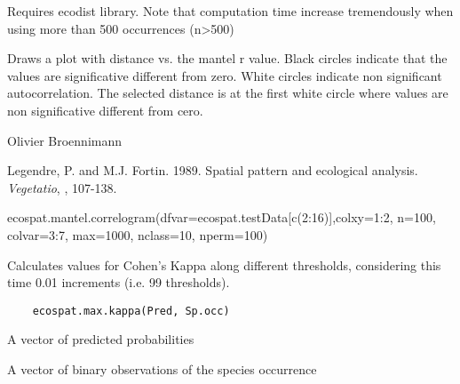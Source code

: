 \documentclass[a4paper]{book}
\begin{document}
%
\begin{Details}\relax
Requires ecodist library. Note that computation time increase tremendously when using more than 500 occurrences (n>500)
\end{Details}
%
\begin{Value}
Draws a plot with distance vs. the mantel r  value. Black circles indicate that the values are significative different from zero. White circles indicate non significant autocorrelation. The selected distance is at the first white circle where values are non significative different from cero. 
\end{Value}
%
\begin{Author}\relax
Olivier Broennimann 
\end{Author}
%
\begin{References}\relax
Legendre, P. and M.J. Fortin. 1989. Spatial pattern and ecological analysis. \emph{Vegetatio}, , 107-138.
\end{References}
%
\begin{SeeAlso}\relax
{}
\end{SeeAlso}
%
\begin{Examples}
\begin{ExampleCode}
ecospat.mantel.correlogram(dfvar=ecospat.testData[c(2:16)],colxy=1:2, n=100, colvar=3:7, 
max=1000, nclass=10, nperm=100)
\end{ExampleCode}
\end{Examples}
%
\begin{Description}\relax
Calculates values for Cohen's Kappa along different thresholds, considering this time 0.01 increments (i.e. 99 thresholds).
\end{Description}
%
\begin{Usage}
\begin{verbatim}
    ecospat.max.kappa(Pred, Sp.occ)
\end{verbatim}
\end{Usage}
%
\begin{Arguments}
\begin{ldescription}
\item[\code{Pred}] 
A vector of predicted probabilities

\item[\code{Sp.occ}] 
A vector of binary observations of the species occurrence

\end{ldescription}
\end{Arguments}
\end{document}

